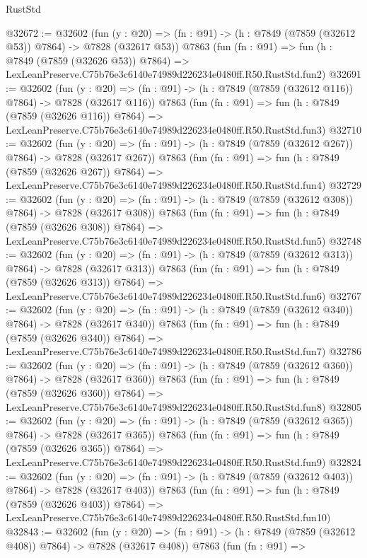 \begin{lexlean}{RustStd}
\begin{coremodule}
@32672 := @32602
    (fun (y : @20) => (fn : @91) -> (h : @7849 (@7859 (@32612 @53)) @7864) -> @7828 (@32617 @53))
    @7863
    (fun (fn : @91) =>
    fun (h : @7849 (@7859 (@32626 @53)) @7864) =>
    LexLeanPreserve.C75b76e3c6140e74989d226234e0480ff.R50.RustStd.fun2)
@32691 := @32602
    (fun (y : @20) => (fn : @91) -> (h : @7849 (@7859 (@32612 @116)) @7864) -> @7828 (@32617 @116))
    @7863
    (fun (fn : @91) =>
    fun (h : @7849 (@7859 (@32626 @116)) @7864) =>
    LexLeanPreserve.C75b76e3c6140e74989d226234e0480ff.R50.RustStd.fun3)
@32710 := @32602
    (fun (y : @20) => (fn : @91) -> (h : @7849 (@7859 (@32612 @267)) @7864) -> @7828 (@32617 @267))
    @7863
    (fun (fn : @91) =>
    fun (h : @7849 (@7859 (@32626 @267)) @7864) =>
    LexLeanPreserve.C75b76e3c6140e74989d226234e0480ff.R50.RustStd.fun4)
@32729 := @32602
    (fun (y : @20) => (fn : @91) -> (h : @7849 (@7859 (@32612 @308)) @7864) -> @7828 (@32617 @308))
    @7863
    (fun (fn : @91) =>
    fun (h : @7849 (@7859 (@32626 @308)) @7864) =>
    LexLeanPreserve.C75b76e3c6140e74989d226234e0480ff.R50.RustStd.fun5)
@32748 := @32602
    (fun (y : @20) => (fn : @91) -> (h : @7849 (@7859 (@32612 @313)) @7864) -> @7828 (@32617 @313))
    @7863
    (fun (fn : @91) =>
    fun (h : @7849 (@7859 (@32626 @313)) @7864) =>
    LexLeanPreserve.C75b76e3c6140e74989d226234e0480ff.R50.RustStd.fun6)
@32767 := @32602
    (fun (y : @20) => (fn : @91) -> (h : @7849 (@7859 (@32612 @340)) @7864) -> @7828 (@32617 @340))
    @7863
    (fun (fn : @91) =>
    fun (h : @7849 (@7859 (@32626 @340)) @7864) =>
    LexLeanPreserve.C75b76e3c6140e74989d226234e0480ff.R50.RustStd.fun7)
@32786 := @32602
    (fun (y : @20) => (fn : @91) -> (h : @7849 (@7859 (@32612 @360)) @7864) -> @7828 (@32617 @360))
    @7863
    (fun (fn : @91) =>
    fun (h : @7849 (@7859 (@32626 @360)) @7864) =>
    LexLeanPreserve.C75b76e3c6140e74989d226234e0480ff.R50.RustStd.fun8)
@32805 := @32602
    (fun (y : @20) => (fn : @91) -> (h : @7849 (@7859 (@32612 @365)) @7864) -> @7828 (@32617 @365))
    @7863
    (fun (fn : @91) =>
    fun (h : @7849 (@7859 (@32626 @365)) @7864) =>
    LexLeanPreserve.C75b76e3c6140e74989d226234e0480ff.R50.RustStd.fun9)
@32824 := @32602
    (fun (y : @20) => (fn : @91) -> (h : @7849 (@7859 (@32612 @403)) @7864) -> @7828 (@32617 @403))
    @7863
    (fun (fn : @91) =>
    fun (h : @7849 (@7859 (@32626 @403)) @7864) =>
    LexLeanPreserve.C75b76e3c6140e74989d226234e0480ff.R50.RustStd.fun10)
@32843 := @32602
    (fun (y : @20) => (fn : @91) -> (h : @7849 (@7859 (@32612 @408)) @7864) -> @7828 (@32617 @408))
    @7863
    (fun (fn : @91) =>

\end{coremodule}
\end{lexlean}
